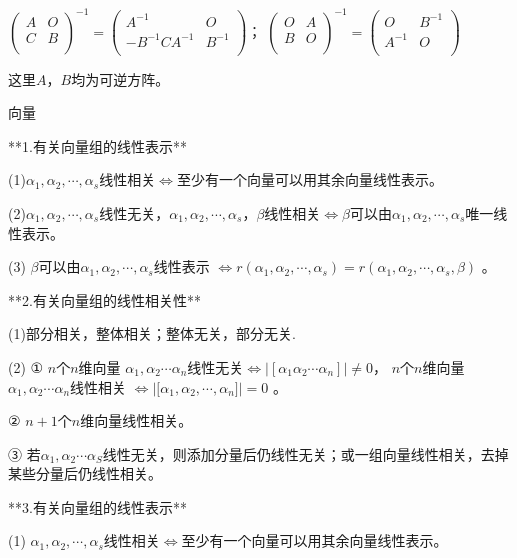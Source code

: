 $\begin{pmatrix} A & O \\ C & B \\ \end{pmatrix}^{- 1} = \begin{pmatrix}  A^{- 1}&{O} \\   - B^{- 1}CA^{- 1} & B^{- 1} \\\end{pmatrix}$； $\begin{pmatrix} O & A \\ B & O \\ \end{pmatrix}^{- 1} =\begin{pmatrix} O & B^{- 1} \\ A^{- 1} & O \\ \end{pmatrix}$

这里$A$，$B$均为可逆方阵。

向量

**1.有关向量组的线性表示**

(1)$\alpha_{1},\alpha_{2},\cdots,\alpha_{s}$线性相关$\Leftrightarrow$至少有一个向量可以用其余向量线性表示。

(2)$\alpha_{1},\alpha_{2},\cdots,\alpha_{s}$线性无关，$\alpha_{1},\alpha_{2},\cdots,\alpha_{s}$，$\beta$线性相关$\Leftrightarrow \beta$可以由$\alpha_{1},\alpha_{2},\cdots,\alpha_{s}$唯一线性表示。

(3) $\beta$可以由$\alpha_{1},\alpha_{2},\cdots,\alpha_{s}$线性表示
$\Leftrightarrow r(\alpha_{1},\alpha_{2},\cdots,\alpha_{s}) =r(\alpha_{1},\alpha_{2},\cdots,\alpha_{s},\beta)$ 。

**2.有关向量组的线性相关性**

(1)部分相关，整体相关；整体无关，部分无关.

(2) ① $n$个$n$维向量
$\alpha_{1},\alpha_{2}\cdots\alpha_{n}$线性无关$\Leftrightarrow \left|\left\lbrack \alpha_{1}\alpha_{2}\cdots\alpha_{n} \right\rbrack \right| \neq0$， $n$个$n$维向量$\alpha_{1},\alpha_{2}\cdots\alpha_{n}$线性相关
$\Leftrightarrow |\lbrack\alpha_{1},\alpha_{2},\cdots,\alpha_{n}\rbrack| = 0$
。

② $n + 1$个$n$维向量线性相关。

③ 若$\alpha_{1},\alpha_{2}\cdots\alpha_{S}$线性无关，则添加分量后仍线性无关；或一组向量线性相关，去掉某些分量后仍线性相关。

**3.有关向量组的线性表示**

(1) $\alpha_{1},\alpha_{2},\cdots,\alpha_{s}$线性相关$\Leftrightarrow$至少有一个向量可以用其余向量线性表示。

